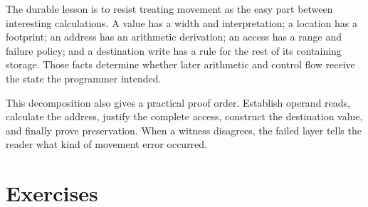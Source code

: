 The durable lesson is to resist treating movement as the easy part between
interesting calculations. A value has a width and interpretation; a location
has a footprint; an address has an arithmetic derivation; an access has a
range and failure policy; and a destination write has a rule for the rest of
its containing storage. Those facts determine whether later arithmetic and
control flow receive the state the programmer intended.

This decomposition also gives a practical proof order. Establish operand
reads, calculate the address, justify the complete access, construct the
destination value, and finally prove preservation. When a witness disagrees,
the failed layer tells the reader what kind of movement error occurred.

\section{Exercises}

